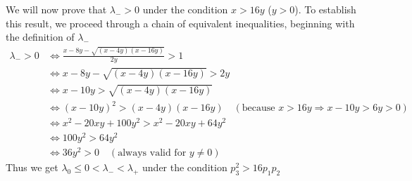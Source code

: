 \documentclass[a4paper, 10pt]{article}
\theoremstyle{definition}
\begin{document}
We will now prove that $\lambda_{-} > 0$ under the condition $x > 16y$ ($y > 0$). To establish this result, we proceed through a chain of equivalent inequalities, beginning with the definition of $\lambda_{-}$
\begin{align*}
\lambda_{-} > 0 
&\iff \frac{x - 8y - \sqrt{(x-4y)(x-16y)}}{2y} > 1 \\
&\iff x - 8y - \sqrt{(x-4y)(x-16y)} > 2y \\
&\iff x - 10y > \sqrt{(x-4y)(x-16y)} \\
&\iff (x - 10y)^2 > (x-4y)(x-16y) \quad (\text{because } x > 16y \Rightarrow x-10y > 6y > 0) \\
&\iff x^2 - 20xy + 100y^2 > x^2 - 20xy + 64y^2 \\
&\iff 100y^2 > 64y^2 \\
&\iff 36y^2 > 0 \quad (\text{always valid for  } y \neq 0)
\end{align*}
Thus we get  $\lambda_0 \leq 0 <\lambda_- <   \lambda_+$ under the condition $p_3^2>16p_1p_2$
\newpage
\end{document}
